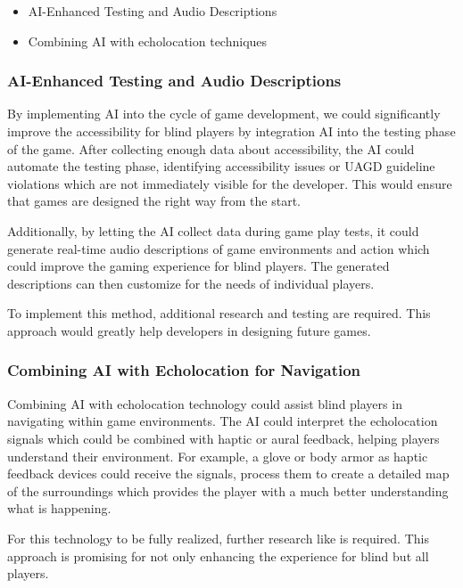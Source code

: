 \documentclass[sigconf,natbib=false,10pt]{acmart}
\begin{document}
	\begin{itemize}
		\setlength\itemsep{0.5em}
		\item AI-Enhanced Testing and Audio Descriptions
		\item Combining AI with echolocation techniques
	\end{itemize}

	\subsubsection{AI-Enhanced Testing and Audio Descriptions}
	By implementing AI into the cycle of game development, we could significantly improve the accessibility for blind players by integration AI into the testing phase of the game.
	After collecting enough data about accessibility, the AI could automate the testing phase, identifying accessibility issues or UAGD guideline violations which are not immediately visible for the developer.
	This would ensure that games are designed the right way from the start.
	
	Additionally, by letting the AI collect data during game play tests, it could generate real-time audio descriptions of game environments and action which could improve the gaming experience for blind players.
	The generated descriptions can then customize for the needs of individual players.
	
	To implement this method, additional research and testing are required.
	This approach would greatly help developers in designing future games.
	
	\subsubsection{Combining AI with Echolocation for Navigation}
	Combining AI with echolocation technology could assist blind players in navigating within game environments.
	The AI could interpret the echolocation signals which could be combined with haptic or aural feedback, helping players understand their environment.
	For example, a glove or body armor as haptic feedback devices could receive the signals, process them to create a detailed map of the surroundings which provides the player with a much better understanding what is happening.
	
	For this technology to be fully realized, further research like \textcite{andrade_echo-house_2018} is required.
	This approach is promising for not only enhancing the experience for blind but all players.
	
\end{document}
